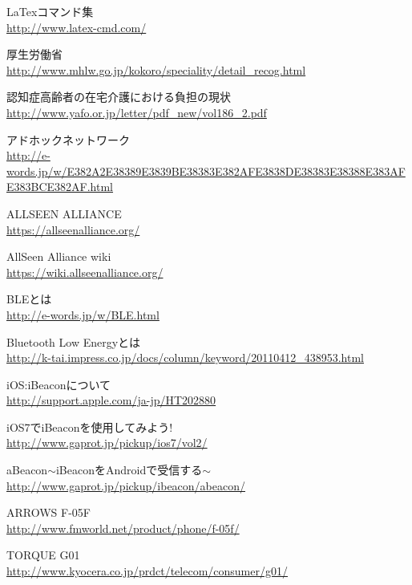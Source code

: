 \def\line{−\hspace*{-.7zw}−}

\begin{thebibliography}{99}

 LaTexコマンド集 \\ 
\url{http://www.latex-cmd.com/}

厚生労働省\\
\url{http://www.mhlw.go.jp/kokoro/speciality/detail_recog.html}

認知症高齢者の在宅介護における負担の現状\\
\url{http://www.yafo.or.jp/letter/pdf_new/vol186_2.pdf}

 アドホックネットワーク \\
\url{http://e-words.jp/w/E382A2E38389E3839BE38383E382AFE3838DE38383E38388E383AFE383BCE382AF.html}

ALLSEEN ALLIANCE \\
\url{https://allseenalliance.org/}

AllSeen Alliance wiki \\
\url{https://wiki.allseenalliance.org/}

BLEとは\\
\url{http://e-words.jp/w/BLE.html}

Bluetooth Low Energyとは\\
\url{http://k-tai.impress.co.jp/docs/column/keyword/20110412_438953.html}

iOS:iBeaconについて \\ 
\url{http://support.apple.com/ja-jp/HT202880}

iOS7でiBeaconを使用してみよう! \\ 
\url{http://www.gaprot.jp/pickup/ios7/vol2/}

aBeacon$\sim$iBeaconをAndroidで受信する$\sim$ \\
\url{http://www.gaprot.jp/pickup/ibeacon/abeacon/}

ARROWS F-05F\\
\url{http://www.fmworld.net/product/phone/f-05f/}

TORQUE G01\\
\url{http://www.kyocera.co.jp/prdct/telecom/consumer/g01/}


\end{thebibliography}
